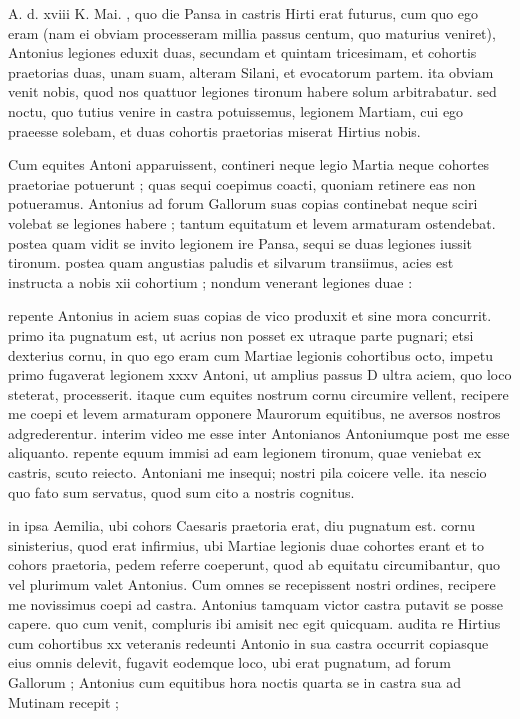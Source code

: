 


 A. d. xviii K. Mai. , quo die Pansa in castris Hirti erat futurus, cum quo ego eram (nam ei obviam processeram millia passus centum, quo maturius veniret), Antonius legiones eduxit duas, secundam et quintam tricesimam, et cohortis praetorias duas, unam suam, alteram Silani, et evocatorum partem. ita obviam venit nobis, quod nos quattuor legiones tironum habere solum arbitrabatur. sed noctu, quo tutius venire in castra potuissemus, legionem Martiam, cui ego praeesse solebam, et duas cohortis praetorias miserat Hirtius nobis.

 Cum equites Antoni apparuissent, contineri neque legio Martia neque cohortes praetoriae potuerunt ; quas sequi coepimus coacti, quoniam retinere eas non potueramus. Antonius ad forum Gallorum suas copias continebat neque sciri volebat se legiones habere ; tantum equitatum et levem armaturam ostendebat. postea quam vidit se invito legionem ire Pansa, sequi se duas legiones iussit tironum. postea quam angustias paludis et silvarum transiimus, acies est instructa a nobis xii cohortium ; nondum venerant legiones duae :

 repente Antonius in aciem suas copias de vico produxit et sine mora concurrit. primo ita pugnatum est, ut acrius non posset ex utraque parte pugnari; etsi dexterius cornu, in quo ego eram cum Martiae legionis cohortibus octo, impetu primo fugaverat legionem xxxv Antoni, ut amplius passus D ultra aciem, quo loco steterat, processerit. itaque cum equites nostrum cornu circumire vellent, recipere me coepi et levem armaturam opponere Maurorum equitibus, ne aversos nostros adgrederentur. interim video me esse inter Antonianos Antoniumque post me esse aliquanto. repente equum immisi ad eam legionem tironum, quae veniebat ex castris, scuto reiecto. Antoniani me insequi; nostri pila coicere velle. ita nescio quo fato sum servatus, quod sum cito a nostris cognitus.

 in ipsa Aemilia, ubi cohors Caesaris praetoria erat, diu pugnatum est. cornu sinisterius, quod erat infirmius, ubi Martiae legionis duae cohortes erant et to cohors praetoria, pedem referre coeperunt, quod ab equitatu circumibantur, quo vel plurimum valet Antonius. Cum omnes se recepissent nostri ordines, recipere me novissimus coepi ad castra. Antonius tamquam victor castra putavit se posse capere. quo cum venit, compluris ibi amisit nec egit quicquam. audita re Hirtius cum cohortibus xx veteranis redeunti Antonio in sua castra occurrit copiasque eius omnis delevit, fugavit eodemque loco, ubi erat pugnatum, ad forum Gallorum ; Antonius cum equitibus hora noctis quarta se in castra sua ad Mutinam recepit ;

